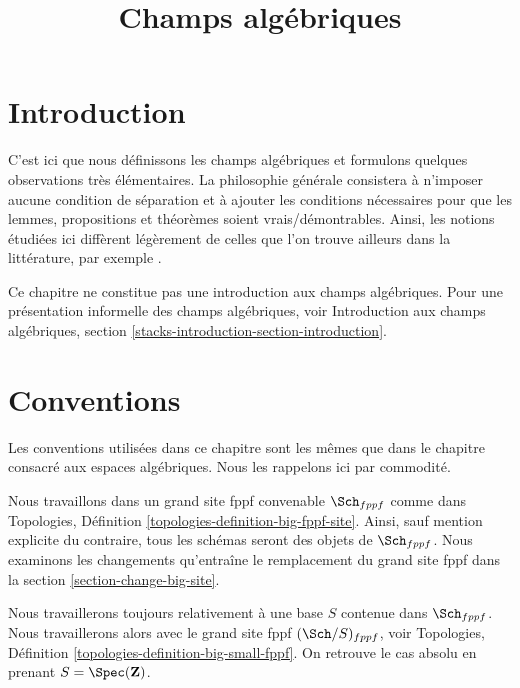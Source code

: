 

%


\title{Champs algébriques}


\maketitle

\label{section-phantom}

\tableofcontents

\section{Introduction}
\label{section-introduction}

\noindent
C'est ici que nous définissons les champs algébriques et formulons quelques
observations très élémentaires. La philosophie générale consistera à n'imposer
aucune condition de séparation et à ajouter les conditions nécessaires pour que
les lemmes, propositions et théorèmes soient vrais/démontrables. Ainsi, les notions
étudiées ici diffèrent légèrement de celles que l'on trouve ailleurs dans la littérature, par exemple
\cite{LM-B}.

\medskip\noindent
Ce chapitre ne constitue pas une introduction aux champs algébriques.
Pour une présentation informelle des champs algébriques, voir
Introduction aux champs algébriques, section
\ref{stacks-introduction-section-introduction}.


\section{Conventions}
\label{section-conventions}

\noindent
Les conventions utilisées dans ce chapitre sont les mêmes que dans le
chapitre consacré aux espaces algébriques. Nous les rappelons ici par commodité.

\medskip\noindent
Nous travaillons dans un grand site fppf convenable $\Sch_{fppf}$
comme dans Topologies, Définition \ref{topologies-definition-big-fppf-site}.
Ainsi, sauf mention explicite du contraire, tous les schémas seront des objets
de $\Sch_{fppf}$. Nous examinons les changements qu'entraîne le remplacement du grand
site fppf dans la
section \ref{section-change-big-site}.

\medskip\noindent
Nous travaillerons toujours relativement à une base $S$ contenue dans $\Sch_{fppf}$.
Nous travaillerons alors avec le grand site fppf $(\Sch/S)_{fppf}$, voir
Topologies, Définition \ref{topologies-definition-big-small-fppf}.
On retrouve le cas absolu en prenant
$S = \Spec(\mathbf{Z})$.


